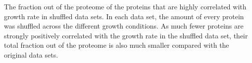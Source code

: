 \label{fig:shuffledglobgrcorr}
The fraction out of the proteome of the proteins that are highly correlated with growth rate in shuffled data sets.
In each data set, the amount of every protein was shuffled across the different growth conditions.
As much fewer proteins are strongly positively correlated with the growth rate in the shuffled data set, their total fraction out of the proteome is also much smaller compared with the original data sets.